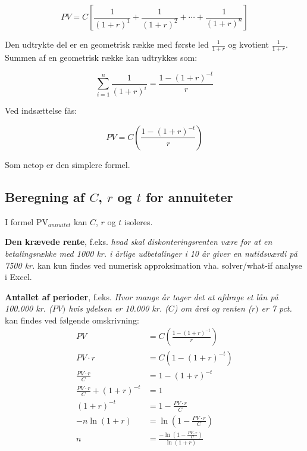 \documentclass[10pt,reqno, usenames]{article}
\begin{document}
\begin{tcolorbox}[breakable, colback=red!5!white, colframe=red!50!black, title= Eksempel 3: Beregning af nutidsværdi for betalingsrækker]
\[
PV = C \left[ \frac{1}{(1 + r)^1} + \frac{1}{(1 + r)^2} + \cdots + \frac{1}{(1 + r)^n} \right]
\]

Den udtrykte del er en geometrisk række med første led \(\frac{1}{1+r}\) og kvotient \(\frac{1}{1+r}\). Summen af en geometrisk række kan udtrykkes som:

\[
\sum_{i=1}^{n} \frac{1}{(1 + r)^i} = \frac{1 - (1 + r)^{-t}}{r}
\]

Ved indsættelse fås:

\[
PV = C \left( \frac{1 - (1 + r)^{-t}}{r} \right)
\]

Som netop er den simplere formel.
\end{tcolorbox}

\newpage

\subsection{Beregning af $C$, $r$ og $t$ for annuiteter}
I formel PV$_{annuitet}$ kan $C$, $r$ og $t$ isoleres. 

\vspace{10 pt}

\textbf{Den krævede rente}, f.eks. \textit{hvad skal diskonteringsrenten være for at en betalingsrække med 1000 kr. i årlige udbetalinger i 10 år giver en nutidsværdi på 7500 kr.} kan kun findes ved numerisk approksimation vha. solver/what-if analyse i Excel. 

\vspace{10 pt}

\textbf{Antallet af perioder}, f.eks. \textit{Hvor mange år tager det at afdrage et lån på 100.000 kr. ($PV)$ hvis ydelsen er 10.000 kr. ($C$) om året og renten ($r)$ er 7 pct.} kan findes ved følgende omskrivning: 
\begin{align}
PV &= C \left( \frac{1 - (1 + r)^{-t}}{r} \right) \nonumber\\
PV \cdot r &= C \left( 1 - (1 + r)^{-t} \right) \nonumber\\
\frac{PV \cdot r}{C} &= 1 - (1 + r)^{-t} \nonumber\\
\frac{PV \cdot r}{C} + (1 + r)^{-t} &= 1 \nonumber\\
(1 + r)^{-t} &= 1 - \frac{PV \cdot r}{C} \nonumber\\
-n \ln(1 + r) &= \ln \left( 1 - \frac{PV \cdot r}{C} \right) \nonumber\\
n &= \frac{-\ln \left( 1 - \frac{PV \cdot r}{C} \right)}{\ln(1 + r)}
\end{align}
\end{document}
